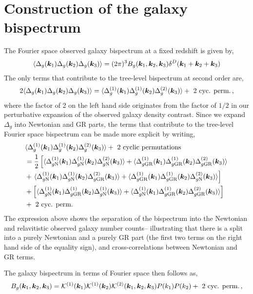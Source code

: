 \section{Construction of the galaxy bispectrum}
The Fourier space observed galaxy bispectrum at a fixed redshift is given by, 
\begin{equation}
	\langle \Delta_g(\bm {k}_1) \Delta_g(\bm {k}_2) \Delta_g(\bm {k}_3) \rangle = (2\pi)^3 B_g(\bm {k}_1,\bm {k}_2,\bm {k}_3) \delta^D(\bm {k}_1+\bm {k}_2+\bm {k}_3)
\end{equation}
The only terms that contribute to the tree-level bispectrum at second order are, 
\begin{equation}
	2 \langle \Delta_g(\bm {k}_1) \Delta_g(\bm {k}_2) \Delta_g(\bm {k}_3) \rangle = \langle \Delta^{(1)}_g(\bm {k}_1) \Delta^{(1)}_g(\bm {k}_2) \Delta^{(2)}_g(\bm {k}_3) \rangle +\text{ 2 cyc. perm.}\,,
\end{equation}
where the factor of 2 on the left hand side originates from the factor of $1/2$ in our perturbative expansion of the observed galaxy density contrast. Since we expand $\Delta_g$ into Newtonian and GR parts, the terms that contribute to the tree-level Fourier space bispectrum can be made more explicit by writing, 
\begin{align}
	&\langle \Delta_g^{(1)}(\bm {k}_1) \Delta_g^{(1)}(\bm {k}_2) \Delta_g^{(2)}(\bm {k}_3) \rangle +\text{ 2 cyclic permutations} \nonumber \\
	&=\frac{1}{2}\left[ \langle \Delta_{g\mathrm{N}}^{(1)}(\bm {k}_1) \Delta_{g\mathrm{N}}^{(1)}(\bm {k}_2) \Delta_{g\mathrm{N}}^{(2)}(\bm {k}_3) \rangle + \langle \Delta_{g\mathrm{GR}}^{(1)}(\bm {k}_1) \Delta_{g\mathrm{GR}}^{(1)}(\bm {k}_2) \Delta_{g\mathrm{GR}}^{(2)}(\bm {k}_3) \rangle \right. \nonumber \\
	& +\left. \langle \Delta_{g\mathrm{N}}^{(1)}(\bm {k}_1) \Delta_{g\mathrm{N}}^{(1)}(\bm {k}_2) \Delta_{g\mathrm{GR}}^{(2)}(\bm {k}_3) \rangle + \langle \Delta_{g\mathrm{GR}}^{(1)}(\bm {k}_1) \Delta_{g\mathrm{GR}}^{(1)}(\bm {k}_2) \Delta_{g\mathrm{N}}^{(2)}(\bm {k}_3) \rangle  \right] \nonumber  \\
	& + \left[ \langle \Delta_{g\mathrm{N}}^{(1)}(\bm {k}_1) \Delta_{g\mathrm{GR}}^{(1)}(\bm {k}_2) \Delta_{g\mathrm{N}}^{(1)}(\bm {k}_3) \rangle + \langle \Delta_{g\mathrm{N}}^{(1)}(\bm {k}_1) \Delta_{g\mathrm{GR}}^{(1)}(\bm {k}_2) \Delta_{g\mathrm{GR}}^{(2)}(\bm {k}_3) \rangle \right] \nonumber \\
	&+ \text{ 2 cyc. perm. }
\end{align}
The expression above shows the separation of the bispectrum into the Newtonian and relavitistic observed galaxy number counts-- illustrating that there is a split into a purely Newtonian and a purely GR part (the first two terms on the right hand side of the equality sign), and cross-correlations between Newtonian and GR terms. 

The galaxy bispectrum in terms of Fourier space then follows as, 
\begin{equation}
 	B_g(\bm {k}_1,\bm {k}_2,\bm {k}_3) = \mathcal{K}^{(1)}(\bm {k}_1) \mathcal{K}^{(1)}(\bm {k}_2) \mathcal{K}^{(2)}(\bm {k}_1,\bm {k}_2,\bm {k}_3) P(k_1) P(k_2) + \text{ 2 cyc. perm.}\,,
 \end{equation} 

